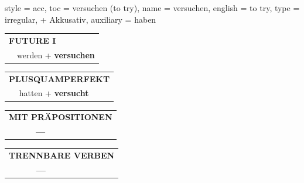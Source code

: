 \begin{verbentry}{
  style = {acc},
  toc = {versuchen (to try)},
  name = {versuchen},
  english = {to try},
  type = {irregular, + Akkusativ},
  auxiliary = {haben}
}
\begin{tabular}{rl}
    \multicolumn{2}{l}{\textbf{FUTURE I} }\\
  &  werden + \textbf{versuchen}\\
 
  \end{tabular}
\hfill
   \begin{tabular}{rl}
      \multicolumn{2}{l}{\textbf{PLUSQUAMPERFEKT}}\\
   & hatten + \textbf{versucht}\\
  \end{tabular}
  
  
\vspace{10pt}

\begin{tabular}{lll}
\multicolumn{3}{l}{\textbf{MIT PRÄPOSITIONEN}}\\
& \textbf{---} & \\
\end{tabular}
\hfill
\begin{tabular}{lll}
\multicolumn{3}{l}{\textbf{TRENNBARE VERBEN}}\\
& \textbf{---} & \\
\end{tabular}
\vspace{-5pt}
\end{verbentry}

